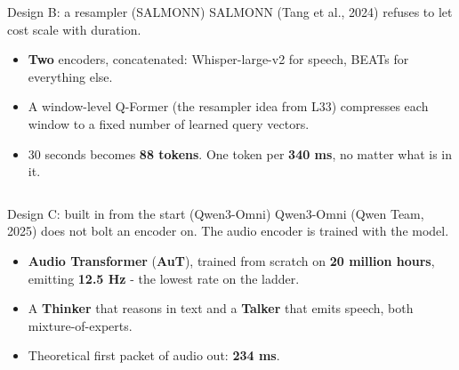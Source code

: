 \documentclass[aspectratio=169]{beamer}
\begin{document}
\begin{frame}{Design B: a resampler (SALMONN)}
  \small
  SALMONN (Tang et al., 2024) refuses to let cost scale with duration.
  \vskip 6pt
  \begin{itemize}\itemsep3pt
    \item \textbf{Two} encoders, concatenated: Whisper-large-v2 for speech, BEATs for
      everything else.
    \item A window-level Q-Former (the resampler idea from L33) compresses each window to a
      fixed number of learned query vectors.
    \item 30 seconds becomes \textbf{88 tokens}. One token per \textbf{340 ms}, no matter what
      is in it.
  \end{itemize}
  \vskip 6pt
  \begin{columns}[T]
  \end{columns}
\end{frame}

\begin{frame}{Design C: built in from the start (Qwen3-Omni)}
  \small
  Qwen3-Omni (Qwen Team, 2025) does not bolt an encoder on. The audio encoder is trained with
  the model.
  \vskip 6pt
  \begin{itemize}\itemsep3pt
    \item \textbf{Audio Transformer} (\textbf{AuT}), trained from scratch on \textbf{20 million
      hours}, emitting \textbf{12.5 Hz} - the lowest rate on the ladder.
    \item A \textbf{Thinker} that reasons in text and a \textbf{Talker} that emits speech, both
      mixture-of-experts.
    \item Theoretical first packet of audio out: \textbf{234 ms}.
  \end{itemize}
  \vskip 8pt
\end{frame}
\end{document}
